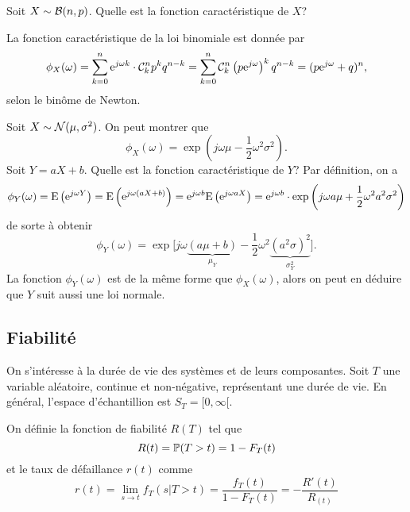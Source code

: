 \documentclass[11pt]{article}
\newcommand\comb[2]{%
	\ensuremath{%
		\mathcal{C}_{#2}^{#1}%
	}%
}%
\renewcommand\P{%
	\ensuremath{%
		\mathbb{P}%
	}%
}%
\newcommand\e{%
	\ensuremath{%
		\mathrm{e}%
	}%
}%
\newcommand\bin{%
	\ensuremath{%
		\mathcal{B}%
	}%
}%
\newcommand\Norm{%
	\ensuremath{%
		\mathcal{N}%
	}%
}%
\newcommand\Esp{%
	\ensuremath{%
		\mathrm{E}%
	}%
}%
\begin{document}
\begin{exemple}
	Soit $X\sim\bin(n,p)$. Quelle est la fonction caractéristique de $X$?

	La fonction caractéristique de la loi binomiale est donnée par
	\begin{equation*}
		\phi_X(\omega)
		=\sum_{k=0}^n\e^{j\omega k}\cdot\comb{n}{k}p^kq^{n-k}
		=\sum_{k=0}^n\comb{n}{k}\left(p\e^{j\omega}\right)^kq^{n-k}
		=(p\e^{j\omega}+q)^n,
	\end{equation*}
	selon le binôme de Newton.
\end{exemple}

\pagebreak
\begin{exemple}
	Soit $X\sim\Norm(\mu,\sigma^2)$. On peut montrer que
	\begin{equation*}
		\phi_X(\omega)=\exp\left(j\omega\mu-\frac{1}{2}\omega^2\sigma^2\right).
	\end{equation*}
	Soit $Y=aX+b$. Quelle est la fonction caractéristique de $Y$?
	Par définition, on a
	\begin{equation*}
		\phi_Y(\omega)
		=\Esp\left(\e^{j\omega Y}\right)
		=\Esp\left(\e^{j\omega(aX+b)}\right)
		=\e^{j\omega b}\Esp\left(\e^{j\omega aX}\right)
		=\e^{j\omega b}\cdot\exp\left(j\omega a\mu+\frac{1}{2}
			\omega^2a^2\sigma^2
		\right)
	\end{equation*}
	de sorte à obtenir
	\begin{equation*}
		\phi_Y(\omega)=
		\exp\bigg[
			j\omega\underbrace{(a\mu+b)}_{\mu_Y}-
			\frac{1}{2}\omega^2\underbrace{(a^2\sigma)^2}_{\sigma_Y^2}
		\bigg].
	\end{equation*}
	La fonction $\phi_Y(\omega)$ est de la même forme que $\phi_X(\omega)$,
	alors on peut en déduire que $Y$ suit aussi une loi normale.
\end{exemple}

\subsection{Fiabilité}
On s'intéresse à la durée de vie des systèmes et de leurs composantes. Soit $T$
une variable aléatoire, continue et non-négative, représentant une durée de
vie. En général, l'espace d'échantillion est $S_T=[0,\infty[$.

On définie la fonction de fiabilité $R(T)$ tel que
\begin{equation*}
R(t)=\P(T>t)=1-F_T(t)
\end{equation*}
et le taux de défaillance $r(t)$ comme
\begin{equation*}
	r(t)
	=\lim_{s\rightarrow t}f_T(s|T>t)
	=\frac{f_T(t)}{1-F_T(t)}
	=-\frac{R\prime(t)}{R_(t)}
\end{equation*}
\end{document}

